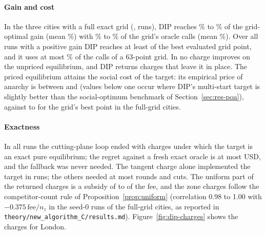 \documentclass[preprint,12pt]{elsarticle}
\theoremstyle{definition}
\theoremstyle{remark}
\begin{document}
\paragraph{Gain and cost} In the three cities with a full exact grid (\DipFullCities, \DipFullN{} runs), DIP reaches \DipFullGainMin\% to \DipFullGainMax\% of the grid-optimal gain (mean \DipFullGainMean\%) with \DipFullCallsMin\% to \DipFullCallsMax\% of the grid's oracle calls (mean \DipFullCallsMean\%). Over all runs with a positive gain DIP reaches at least \DipGainMinAll{} of the best evaluated grid point, and it uses at most \DipCallsSixtyThreeMax\% of the calls of a 63-point grid. In \DipNoGainCities{} no charge improves on the unpriced equilibrium, and DIP returns charges that leave it in place. The priced equilibrium attains the social cost of the target: its empirical price of anarchy is between \DipPoAmin{} and \DipPoAmax{} (values below one occur where DIP's multi-start target is slightly better than the social-optimum benchmark of Section~\ref{sec:res-poa}), against \DipFullPoAgridMin{} to \DipFullPoAgridMax{} for the grid's best point in the full-grid cities.

\paragraph{Exactness} In all \DipExactN{} runs the cutting-plane loop ended with charges under which the target is an exact pure equilibrium; the regret against a fresh exact oracle is at most \DipRegretMax{} USD, and the fallback was never needed. The tangent charge alone implemented the target in \DipTangentN{} runs; the others needed at most \DipRoundsMax{} rounds and \DipCutsMax{} cuts. The uniform part of the returned charges is a subsidy of \DipSubsMin{} to \DipSubsMax{} of the fee, and the zone charges follow the competitor-count rule of Proposition~\ref{prop:uniform} (correlation 0.98 to 1.00 with $-0.375\,\mathrm{fee}/n_z$ in the seed-0 runs of the full-grid cities, as reported in \texttt{theory/new\_algorithm\_C/results.md}). Figure~\ref{fig:dip-charges} shows the charges for London.
\end{document}
